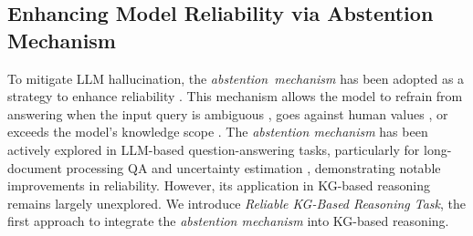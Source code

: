 \subsection{Enhancing Model Reliability via Abstention Mechanism}
To mitigate LLM hallucination, the \mbox{\textit{abstention mechanism}} has been adopted as a strategy to enhance reliability \cite{wen2024knowlimitssurveyabstention}. This mechanism allows the model to refrain from answering when the input query is ambiguous \cite{asai-choi-2021-challenges, cole-etal-2023-selectively}, goes against human values \cite{kirk-etal-2023-past}, or exceeds the model's knowledge scope \cite{feng-etal-2024-dont}.  
The \textit{abstention mechanism} has been actively explored in LLM-based question-answering tasks, particularly for long-document processing QA \cite{buchmann-etal-2024-attribute} and uncertainty estimation \cite{amayuelas-etal-2024-knowledge, wen-etal-2024-characterizing, yang2024alignmenthonesty, tomani2024uncertaintybasedabstentionllmsimproves}, demonstrating notable improvements in reliability.
However, its application in KG-based reasoning remains largely unexplored.
We introduce \textit{Reliable KG-Based Reasoning Task}, the first approach to integrate the \textit{abstention mechanism} into KG-based reasoning.